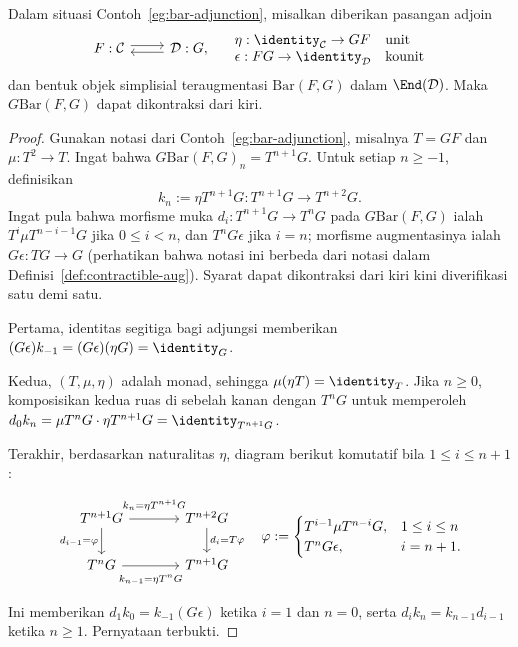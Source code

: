 \begin{proposition}\label{prop:bar-contractible}
	Dalam situasi Contoh~\ref{eg:bar-adjunction}, misalkan diberikan pasangan
	adjoin
	\[\begin{tikzcd}
		F : \mathcal{C} \arrow[shift left, r] & \mathcal{D}: G \arrow[shift left, l] ,
	\end{tikzcd} \quad \begin{array}{ll}
		\eta: \identity_{\mathcal{C}} \to GF & \text{unit} \\
		\epsilon: FG \to \identity_{\mathcal{D}} & \text{kounit}
	\end{array}\]
	dan bentuk objek simplisial teraugmentasi $\mathrm{Bar}(F,G)$ dalam
	$\End(\mathcal{D})$. Maka $G\mathrm{Bar}(F,G)$ dapat dikontraksi dari
	kiri.
\end{proposition}
\begin{proof}
	Gunakan notasi dari Contoh~\ref{eg:bar-adjunction}, misalnya $T=GF$ dan
	$\mu:T^2\to T$. Ingat bahwa
	$G\mathrm{Bar}(F,G)_n=T^{n+1}G$. Untuk setiap $n\geq-1$, definisikan
	\[ k_n := \eta T^{n+1}G: T^{n+1}G \to T^{n+2}G . \]
	Ingat pula bahwa morfisme muka
	$d_i:T^{n+1}G\to T^nG$ pada $G\mathrm{Bar}(F,G)$ ialah
	$T^i\mu T^{n-i-1}G$ jika $0\leq i<n$, dan $T^nG\epsilon$ jika
	$i=n$; morfisme augmentasinya ialah $G\epsilon:TG\to G$
	(perhatikan bahwa notasi ini berbeda dari notasi dalam
	Definisi~\ref{def:contractible-aug}). Syarat dapat dikontraksi dari kiri
	kini diverifikasi satu demi satu.

	Pertama, identitas segitiga bagi adjungsi memberikan
	$(G\epsilon)k_{-1}=(G\epsilon)(\eta G)=\identity_G$.

	Kedua, $(T,\mu,\eta)$ adalah monad, sehingga
	$\mu(\eta T)=\identity_T$. Jika $n\geq0$, komposisikan kedua ruas di
	sebelah kanan dengan $T^nG$ untuk memperoleh
	$d_0k_n=\mu T^nG\cdot\eta T^{n+1}G=\identity_{T^{n+1}G}$.

	Terakhir, berdasarkan naturalitas $\eta$, diagram berikut komutatif bila
	$1\leq i\leq n+1$:
	\[\begin{tikzcd}[column sep=large]
		T^{n+1} G \arrow[r, "{k_n = \eta T^{n+1}G}" inner sep=0.6em] \arrow[d, "{d_{i-1} = \varphi}"'] & T^{n+2}G \arrow[d, "{d_i = T\varphi}"] \\
		T^n G \arrow[r, "{k_{n-1} = \eta T^n G}"' inner sep=0.6em] & T^{n+1} G
	\end{tikzcd} \quad
		\varphi := \begin{cases}
			T^{i-1} \mu T^{n-i} G, & 1 \leq i \leq n \\
			T^n G\epsilon, & i = n+1.
		\end{cases}\]
	Ini memberikan $d_1k_0=k_{-1}(G\epsilon)$ ketika $i=1$ dan $n=0$,
	serta $d_ik_n=k_{n-1}d_{i-1}$ ketika $n\geq1$. Pernyataan terbukti.
\end{proof}


